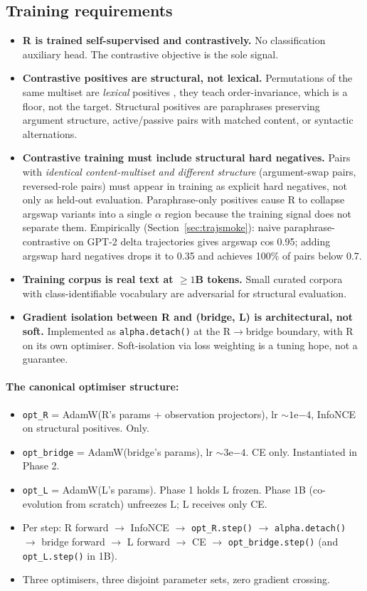 \documentclass[10pt, twocolumn, a4paper]{article}
\newenvironment{checklist}{\begin{itemize}[leftmargin=2em,labelsep=0.5em,itemsep=2pt]\renewcommand{\labelitemi}{$\square$}}{\end{itemize}}
\begin{document}
\subsection*{Training requirements}

\begin{checklist}
\item \textbf{R is trained self-supervised and contrastively.} No classification auxiliary head. The contrastive objective is the sole signal.
\item \textbf{Contrastive positives are structural, not lexical.} Permutations of the same multiset are \emph{lexical} positives ,  they teach order-invariance, which is a floor, not the target. Structural positives are paraphrases preserving argument structure, active/passive pairs with matched content, or syntactic alternations.
\item \textbf{Contrastive training must include structural hard negatives.} Pairs with \emph{identical content-multiset and different structure} (argument-swap pairs, reversed-role pairs) must appear in training as explicit hard negatives, not only as held-out evaluation. Paraphrase-only positives cause R to collapse argswap variants into a single $\alpha$ region because the training signal does not separate them. Empirically (Section~\ref{sec:trajsmoke}): naive paraphrase-contrastive on GPT-2 delta trajectories gives argswap cos 0.95; adding argswap hard negatives drops it to 0.35 and achieves 100\% of pairs below 0.7.
\item \textbf{Training corpus is real text at $\geq 1$B tokens.} Small curated corpora with class-identifiable vocabulary are adversarial for structural evaluation.
\item \textbf{Gradient isolation between R and (bridge, L) is architectural, not soft.} Implemented as \texttt{alpha.detach()} at the R$\to$bridge boundary, with R on its own optimiser. Soft-isolation via loss weighting is a tuning hope, not a guarantee.
\end{checklist}

\paragraph{The canonical optimiser structure:}
\begin{itemize}[nosep,leftmargin=*]
\item \texttt{opt\_R} = AdamW(R's params + observation projectors), lr $\sim 1\mathrm{e}{-4}$, InfoNCE on structural positives. Only.
\item \texttt{opt\_bridge} = AdamW(bridge's params), lr $\sim 3\mathrm{e}{-4}$. CE only. Instantiated in Phase 2.
\item \texttt{opt\_L} = AdamW(L's params). Phase 1 holds L frozen. Phase 1B (co-evolution from scratch) unfreezes L; L receives only CE.
\item Per step: R forward $\to$ InfoNCE $\to$ \texttt{opt\_R.step()} $\to$ \texttt{alpha.detach()} $\to$ bridge forward $\to$ L forward $\to$ CE $\to$ \texttt{opt\_bridge.step()} (and \texttt{opt\_L.step()} in 1B).
\item Three optimisers, three disjoint parameter sets, zero gradient crossing.
\end{itemize}
\end{document}
